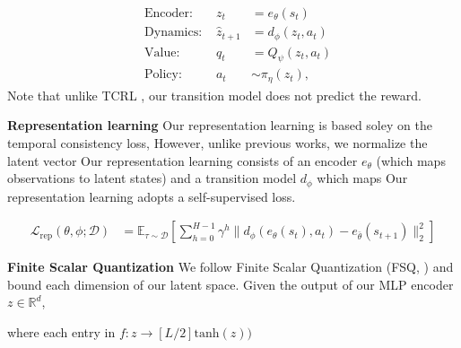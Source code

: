 \documentclass{article}
\theoremstyle{plain}
\theoremstyle{definition}
\theoremstyle{remark}
\newcommand{\E}{\mathbb{E}}
\newcommand{\R}{\mathbb{R}}
\begin{document}
\begin{align}
&\text{Encoder: } & z_{t} &= e_{\theta} (s_{t}) \label{eq:encoder} \\
&\text{Dynamics: } & \hat{z}_{t+1} &= d_{\phi} (z_{t}, a_{t}) \label{eq:transition} \\
&\text{Value: } & q_{t} &= Q_{\psi} (z_{t}, a_{t}) \label{eq:value} \\
&\text{Policy: } & a_{t} &\sim \pi_{\eta} (z_{t}) , \label{eq:policy}
\end{align}
Note that unlike TCRL \citep{zhaoSimplifiedTemporalConsistency2023}, our transition model does
not predict the reward.

\textbf{Representation learning}
Our representation learning is based soley on the temporal consistency loss,
However, unlike previous works, we normalize the latent vector
Our representation learning consists of an encoder $e_{\theta}$ (which maps observations to
latent states) and a transition model $d_{\phi}$ which maps
Our representation learning adopts a self-supervised loss.

\begin{align} \label{eq:rep-loss}
  \mathcal{L}_{\text{rep}}(\theta, \phi; \mathcal{D})
&= \E_{\tau \sim \mathcal{D}}
\left[ \sum_{h=0}^{H-1} \gamma^{h} \| d_{\phi}(e_{\theta}(s_{t}), a_{t}) - e_{\bar{\theta}}(s_{t+1}) \|_{2}^{2} \right]
\end{align}

\textbf{Finite Scalar Quantization}
We follow Finite Scalar Quantization (FSQ, \cite{mentzerFiniteScalarQuantization2023})
and bound each dimension of our latent space.
Given the output of our MLP encoder $z \in \R^{d}$,

where each entry in  $f : z \rightarrow \left[ L/2 \right] \mathrm{tanh}(z))$

\end{document}
